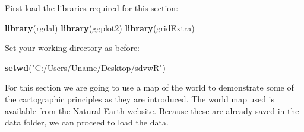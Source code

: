 \documentclass[]{article}
\newenvironment{Shaded}{}{}
\newcommand{\KeywordTok}[1]{\textcolor[rgb]{0.00,0.44,0.13}{\textbf{{#1}}}}
\newcommand{\StringTok}[1]{\textcolor[rgb]{0.25,0.44,0.63}{{#1}}}
\newcommand{\NormalTok}[1]{{#1}}
\begin{document}
First load the libraries required for this section:

\begin{Shaded}
\begin{Highlighting}[]
\KeywordTok{library}\NormalTok{(rgdal)}
\KeywordTok{library}\NormalTok{(ggplot2)}
\KeywordTok{library}\NormalTok{(gridExtra)}
\end{Highlighting}
\end{Shaded}
Set your working directory as before:

\begin{Shaded}
\begin{Highlighting}[]
\KeywordTok{setwd}\NormalTok{(}\StringTok{"C:/Users/Uname/Desktop/sdvwR"}\NormalTok{)}
\end{Highlighting}
\end{Shaded}
For this section we are going to use a map of the world to demonstrate
some of the cartographic principles as they are introduced. The world
map used is available from the Natural Earth website. Because these are
already saved in the data folder, we can proceed to load the data.
\end{document}
